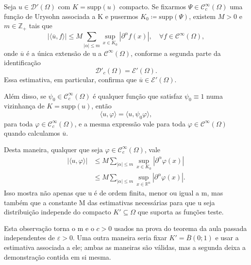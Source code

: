 \documentclass[../distribution_theory_notes.tex]{subfiles}
\begin{document}
\begin{tcolorbox}[
		skin=enhanced,
		title=Observação,
		fonttitle=\bfseries,
		colframe=black,
		colbacktitle=cyan!75!white,
		colback=cyan!15,
		colbacklower=black,
		coltitle=black,
		drop fuzzy shadow,
	]
	Seja \(u\in \mathcal{D}'(\Omega )\) com \(K=\mathrm{supp}(u)\) compacto. Se fixarmos \(\Psi \in \mathcal{C}_{c}^{\infty}(\Omega )\) uma função de Urysohn associada a K e pusermos \(K_{0}\coloneqq \mathrm{supp}(\Psi )\), existem \(M>0\) e \(m\in \mathbb{Z}_{+}\) tais que
	\[
		| \langle \overline{u}, f \rangle |\leq M\sum\limits_{| \alpha  |\leq m}^{}\sup_{x\in K_{0}}| \partial^{\alpha }f(x) |,
		\quad \forall f\in \mathcal{C}^{\infty}(\Omega ),
	\]
	onde \(\overline{u}\) é a única extensão de u a \(\mathcal{C}^{\infty}(\Omega )\), conforme a segunda parte da identificação
	\[
		\mathcal{D}'_{c}(\Omega )=\mathcal{E}'(\Omega ).
	\]
	Essa estimativa, em particular, confirma que \(\overline{u}\in \mathcal{E}'(\Omega )\).

	Além disso, se \(\psi_{0}\in \mathcal{C}_{c}^{\infty}(\Omega )\) é qualquer função que satisfaz \(\psi_{0}\equiv 1\) numa vizinhança de \(K=\mathrm{supp}(u)\), então
	\[
		\langle u, \varphi  \rangle=\langle u, \psi_{0}\varphi  \rangle,
	\]
	para toda \(\varphi \in \mathcal{C}_{c}^{\infty}(\Omega )\), e a mesma expressão vale para toda \(\varphi \in \mathcal{C}^{\infty}(\Omega )\) quando calculamos \(\overline{u}\).

	Desta maneira, qualquer que seja \(\varphi \in \mathcal{C}_{c}^{\infty}(\Omega )\), vale
	\begin{align*}
		| \langle u, \varphi  \rangle | & \leq M\sum\limits_{| \alpha  |\leq m}^{}\sup_{x\in K_{0}}| \partial^{\alpha }\varphi (x) |           \\
		                                & \leq M\sum\limits_{| \alpha  |\leq m}^{}\sup_{x\in \mathbb{R}^{n}}| \partial^{\alpha }\varphi (x) |.
	\end{align*}
	Isso mostra não apenas que u é de ordem finita, menor ou igual a m, mas também que a constante M das estimativas necessárias para que u seja distribuição independe do compacto \(K'\subseteq \Omega \) que suporta as funções teste.

	Esta observação torna o m e o \(c>0\) usados na prova do teorema da aula passada independentes de \(\varepsilon >0\). Uma outra maneira seria fixar \(K'=\overline{B}(0;1)\) e usar a estimativa associada a ele; ambas as maneiras são válidas, mas a segunda deixa a demonstração contida em si mesma.
\end{tcolorbox}
\end{document}
